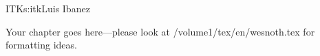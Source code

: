 \begin{aosachapter}{ITK}{s:itk}{Luis Ibanez}

Your chapter goes here---please look at /volume1/tex/en/wesnoth.tex for 
formatting ideas.

\end{aosachapter}
